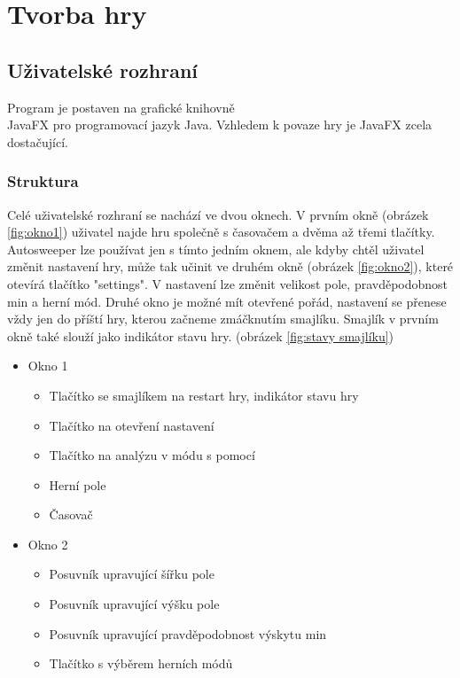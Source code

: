 \section{Tvorba hry}

\subsection{Uživatelské rozhraní}
Program je postaven na grafické knihovně\\ JavaFX pro programovací jazyk Java. Vzhledem k povaze hry je JavaFX zcela 
dostačující.

\subsubsection{Struktura}
Celé uživatelské rozhraní se nachází ve dvou oknech. V prvním okně (obrázek \ref{fig:okno1}) uživatel najde hru 
společně s časovačem a dvěma až třemi tlačítky. Autosweeper lze používat jen s tímto jedním oknem, ale kdyby chtěl
uživatel změnit nastavení hry, může tak učinit ve druhém okně (obrázek \ref{fig:okno2}), které otevírá tlačítko
"settings". V nastavení lze změnit velikost pole, pravděpodobnost min a herní mód. Druhé okno je možné mít otevřené
pořád, nastavení se přenese vždy jen do příští hry, kterou začneme zmáčknutím smajlíku. Smajlík v prvním okně také
slouží jako indikátor stavu hry. (obrázek \ref{fig:stavy smajlíku})

    \begin{itemize}
        \item Okno 1
        \begin{itemize}
            \item Tlačítko se smajlíkem na restart hry, indikátor stavu hry
            \item Tlačítko na otevření nastavení
            \item Tlačítko na analýzu v módu s pomocí
            \item Herní pole
            \item Časovač
        \end{itemize}
        \item Okno 2
        \begin{itemize}
            \item Posuvník upravující šířku pole
            \item Posuvník upravující výšku pole
            \item Posuvník upravující pravděpodobnost výskytu min
            \item Tlačítko s výběrem herních módů
        \end{itemize}
    \end{itemize}

